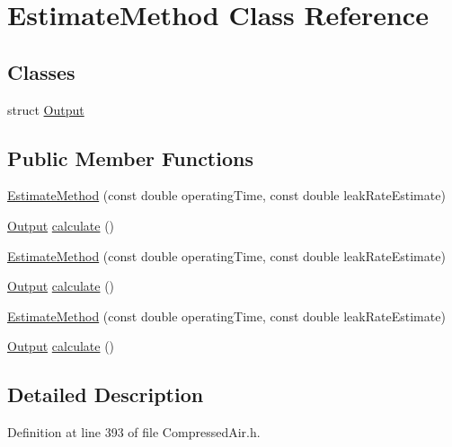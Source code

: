 \hypertarget{class_estimate_method}{}\section{Estimate\+Method Class Reference}
\label{class_estimate_method}
\subsection*{Classes}
\begin{DoxyCompactItemize}
\item 
struct \hyperlink{struct_estimate_method_1_1_output}{Output}
\end{DoxyCompactItemize}
\subsection*{Public Member Functions}
\begin{DoxyCompactItemize}
\item 
\hyperlink{class_estimate_method_a06b06991a5f48051a6c698be0fa31f1d}{Estimate\+Method} (const double operating\+Time, const double leak\+Rate\+Estimate)
\item 
\hyperlink{struct_estimate_method_1_1_output}{Output} \hyperlink{class_estimate_method_af20250d9f657cf7443b9cea66e0dab9e}{calculate} ()
\item 
\hyperlink{class_estimate_method_a06b06991a5f48051a6c698be0fa31f1d}{Estimate\+Method} (const double operating\+Time, const double leak\+Rate\+Estimate)
\item 
\hyperlink{struct_estimate_method_1_1_output}{Output} \hyperlink{class_estimate_method_aed4e370d0b5c2141735af9acacccdedf}{calculate} ()
\item 
\hyperlink{class_estimate_method_a06b06991a5f48051a6c698be0fa31f1d}{Estimate\+Method} (const double operating\+Time, const double leak\+Rate\+Estimate)
\item 
\hyperlink{struct_estimate_method_1_1_output}{Output} \hyperlink{class_estimate_method_aed4e370d0b5c2141735af9acacccdedf}{calculate} ()
\end{DoxyCompactItemize}


\subsection{Detailed Description}


Definition at line 393 of file Compressed\+Air.\+h.



